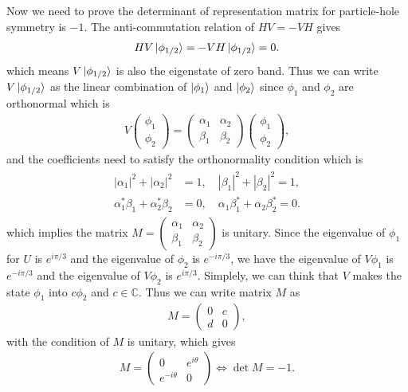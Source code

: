 \documentclass[10pt, oneside]{article}
\newcommand{\te}{\theta}
\newcommand{\ph}{\phi}
\begin{document}
Now we need to prove the determinant of representation matrix for particle-hole symmetry is \(-1\). The anti-commutation relation of \(HV = -VH\) gives
\begin{align}
	H V \ket{\ph_{1/2}} =  - V H \ket{\ph_{1/2}} = 0.
\end{align}
which means \(V \ket{\ph_{1/2}}\) is also the eigenstate of zero band. Thus we can write \(V \ket{\ph_{1/2}}\) as the linear combination of \(\ket{\ph_{1}}\) and \(\ket{\ph_{2}}\) since \(\ph_1\) and \(\ph_2\) are orthonormal which is 
\begin{align}
	V \begin{pmatrix}
		\phi_{1} \\ \phi_{2}
	\end{pmatrix} = \begin{pmatrix}
		\alpha_1 & \alpha_2 \\
		\beta_1 & \beta_2	
	\end{pmatrix} \begin{pmatrix}
		\phi_{1} \\ \phi_{2}
	\end{pmatrix},
\end{align}
and the coefficients need to satisfy the orthonormality condition which is 
\begin{align}
	\begin{split}
		|\alpha_1|^2 + |\alpha_2|^2 &= 1, \quad |\beta_1|^2 + |\beta_2|^2 = 1, \\
		\alpha_1^* \beta_1 + \alpha_2^* \beta_2 &= 0, \quad \alpha_1 \beta_1^* + \alpha_2 \beta_2^* = 0.
	\end{split}
\end{align}
which implies the  matrix \(M = \begin{pmatrix}
	\alpha_1 & \alpha_2 \\
	\beta_1 & \beta_2	
\end{pmatrix}\) is unitary. Since the eigenvalue of \(\phi_1\) for \(U\) is \(e^{i \pi/3}\) and the eigenvalue of \(\phi_2\) is \(e^{-i \pi/3}\), we have the eigenvalue of \(V \phi_1\) is \(e^{- i \pi/3}\) and the eigenvalue of \(V \phi_2\) is \(e^{i \pi/3}\). Simplely, we can think that \(V\) makes the state \(\phi_1\) into \(c \phi_2\) and \(c \in \mathbb{C}\). Thus we can write matrix \(M\) as
\begin{align}
	M = \begin{pmatrix}
		0 & c \\
		d & 0
	\end{pmatrix},
\end{align}
with the condition of \(M\) is unitary, which gives
\begin{align}
	M = \begin{pmatrix}
		0 & e^{i \te} \\
		e^{-i \te} & 0
	\end{pmatrix} \Leftrightarrow \det M = -1.
\end{align}
\end{document}

